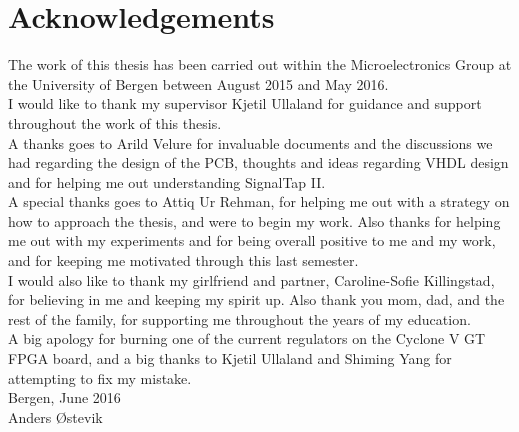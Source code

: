 \documentclass[main.tex]{subfiles}
\begin{document}
\chapter*{Acknowledgements}



{\setlength{\parindent}{0cm}
The work of this thesis has been carried out within the Microelectronics Group at the University of Bergen between August 2015 and May 2016.\\

I would like to thank my supervisor Kjetil Ullaland for guidance and support throughout the work of this thesis.\\

A thanks goes to Arild Velure for invaluable documents and the discussions we had regarding the design of the PCB, thoughts and ideas regarding VHDL design and for helping me out understanding SignalTap II.\\

A special thanks goes to Attiq Ur Rehman, for helping me out with a strategy on how to approach the thesis, and were to begin my work. Also thanks for helping me out with my experiments and for being overall positive to me and my work, and for keeping me motivated through this last semester.\\

I would also like to thank my girlfriend and partner, Caroline-Sofie Killingstad, for believing in me and keeping my spirit up.
Also thank you mom, dad, and the rest of the family, for supporting me throughout the years of my education.\\

A big apology for burning one of the current regulators on the Cyclone V GT FPGA board, and a big thanks to Kjetil Ullaland and Shiming Yang for attempting to fix my mistake.\\[3em]


Bergen, June 2016 \\[1em]


Anders Østevik

}

\end{document}

